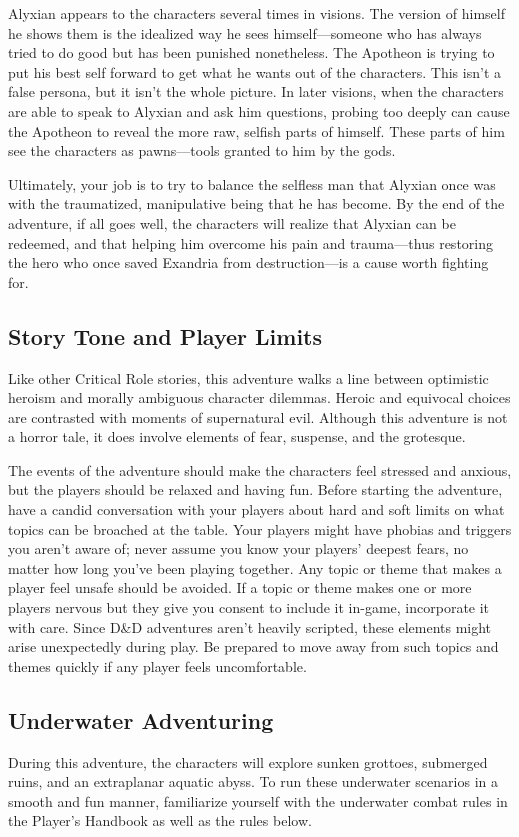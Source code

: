 \documentclass[10pt,a4paper,twoside,bg=print,twocolumn,openany,nodeprecatedcode]{dndbook}
\begin{document}
Alyxian appears to the characters several times in visions. The version of himself he shows them is the idealized way he sees himself—someone who has always tried to do good but has been punished nonetheless. The Apotheon is trying to put his best self forward to get what he wants out of the characters. This isn't a false persona, but it isn't the whole picture. In later visions, when the characters are able to speak to Alyxian and ask him questions, probing too deeply can cause the Apotheon to reveal the more raw, selfish parts of himself. These parts of him see the characters as pawns—tools granted to him by the gods.

Ultimately, your job is to try to balance the selfless man that Alyxian once was with the traumatized, manipulative being that he has become. By the end of the adventure, if all goes well, the characters will realize that Alyxian can be redeemed, and that helping him overcome his pain and trauma—thus restoring the hero who once saved Exandria from destruction—is a cause worth fighting for.

\subsection{Story Tone and Player Limits}
Like other Critical Role stories, this adventure walks a line between optimistic heroism and morally ambiguous character dilemmas. Heroic and equivocal choices are contrasted with moments of supernatural evil. Although this adventure is not a horror tale, it does involve elements of fear, suspense, and the grotesque.

The events of the adventure should make the characters feel stressed and anxious, but the players should be relaxed and having fun. Before starting the adventure, have a candid conversation with your players about hard and soft limits on what topics can be broached at the table. Your players might have phobias and triggers you aren't aware of; never assume you know your players' deepest fears, no matter how long you've been playing together. Any topic or theme that makes a player feel unsafe should be avoided. If a topic or theme makes one or more players nervous but they give you consent to include it in-game, incorporate it with care. Since D\&D adventures aren't heavily scripted, these elements might arise unexpectedly during play. Be prepared to move away from such topics and themes quickly if any player feels uncomfortable.

\subsection{Underwater Adventuring}
During this adventure, the characters will explore sunken grottoes, submerged ruins, and an extraplanar aquatic abyss. To run these underwater scenarios in a smooth and fun manner, familiarize yourself with the underwater combat rules in the Player's Handbook as well as the rules below.
\end{document}
